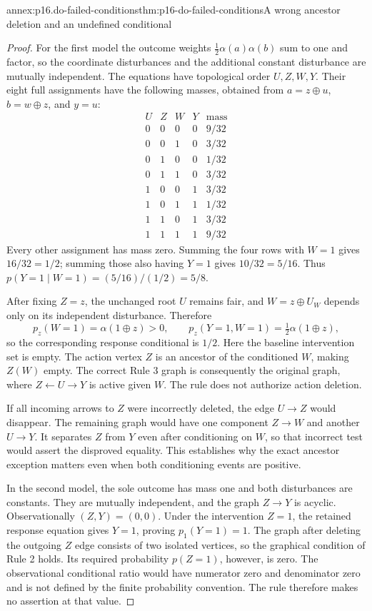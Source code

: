 \begin{annexitem}{annex:p16.do-failed-conditions}{thm:p16-do-failed-conditions}{A wrong ancestor deletion and an undefined conditional}
\begin{proof}
For the first model the outcome weights
\(\frac12\alpha(a)\alpha(b)\) sum to one and factor, so the
coordinate disturbances and the additional constant disturbance are
mutually independent. The equations have topological order
\(U,Z,W,Y\). Their eight full assignments have the following
masses, obtained from \(a=z\oplus u\), \(b=w\oplus z\),
and \(y=u\):
\[
\begin{array}{cccc|c}
 U&Z&W&Y&\text{mass}\\\hline
 0&0&0&0&9/32\\
 0&0&1&0&3/32\\
 0&1&0&0&1/32\\
 0&1&1&0&3/32\\
 1&0&0&1&3/32\\
 1&0&1&1&1/32\\
 1&1&0&1&3/32\\
 1&1&1&1&9/32
\end{array}
\]
Every other assignment has mass zero. Summing the four rows with
\(W=1\) gives \(16/32=1/2\); summing those also having
\(Y=1\) gives \(10/32=5/16\). Thus
\(p(Y=1\mid W=1)=(5/16)/(1/2)=5/8\).

After fixing \(Z=z\), the unchanged root \(U\) remains fair,
and \(W=z\oplus U_W\) depends only on its independent disturbance.
Therefore
\[
 p_z(W=1)=\alpha(1\oplus z)>0,\qquad
 p_z(Y=1,W=1)=\tfrac12\alpha(1\oplus z),
\]
so the corresponding response conditional is \(1/2\). Here the
baseline intervention set is empty. The action vertex \(Z\) is
an ancestor of the conditioned \(W\), making \(Z(W)\) empty.
The correct Rule 3 graph is consequently the original graph, where
\(Z\leftarrow U\to Y\) is active given \(W\). The rule
does not authorize action deletion.

If all incoming arrows to \(Z\) were incorrectly deleted, the
edge \(U\to Z\) would disappear. The remaining graph would
have one component \(Z\to W\) and another \(U\to Y\).
It separates \(Z\) from \(Y\) even after conditioning on \(W\),
so that incorrect test would assert the disproved equality. This
establishes why the exact ancestor exception matters even when both
conditioning events are positive.

In the second model, the sole outcome has mass one and both disturbances
are constants. They are mutually independent, and the graph \(Z\to Y\)
is acyclic. Observationally \((Z,Y)=(0,0)\). Under the intervention
\(Z=1\), the retained response equation gives \(Y=1\), proving
\(p_1(Y=1)=1\). The graph after deleting the outgoing \(Z\)
edge consists of two isolated vertices, so the graphical condition
of Rule 2 holds. Its required probability \(p(Z=1)\), however,
is zero. The observational conditional ratio would have numerator
zero and denominator zero and is not defined by the finite probability
convention. The rule therefore makes no assertion at that value.


\end{proof}
\end{annexitem}
